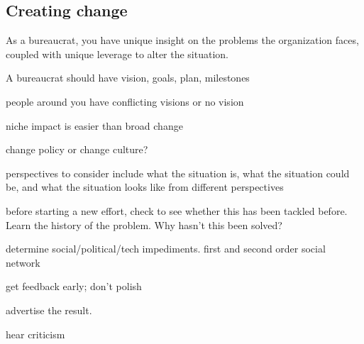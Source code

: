 \subsection{Creating change\label{sec:creating_change}}

As a bureaucrat, you have unique insight on the problems the organization faces, coupled with unique leverage to alter the situation. 

A bureaucrat should have vision, goals, plan, milestones

people around you have conflicting visions or no vision

niche impact is easier than broad change

change policy or change culture?

perspectives to consider include what the situation is, what the situation could be, and what the situation looks like from different perspectives

before starting a new effort, check to see whether this has been tackled before. Learn the history of the problem. Why hasn't this been solved?

determine social/political/tech impediments. first and second order social network

get feedback early; don't polish

advertise the result.

hear criticism
